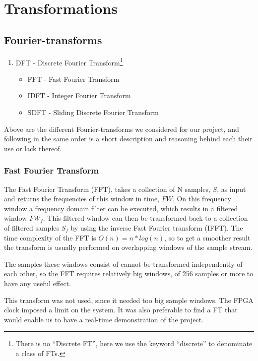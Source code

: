 \chapter{Transformations}
\section{Fourier-transforms}

\begin{enumerate}
\item DFT - Discrete Fourier Transform\footnote{There is no ``Discrete FT'',
here we use the keyword ``discrete'' to denominate a class of FTs.}
	\begin{itemize}
		\item FFT - Fast Fourier Transform
		\item IDFT - Integer Fourier Transform
		\item SDFT - Sliding Discrete Fourier Transform
	\end{itemize}
\end{enumerate}

Above are the different Fourier-transforms we considered for our project, and
following in the same order is a short description and reasoning behind  each
their use or lack thereof.

\subsection{Fast Fourier Transform}
The Fast Fourier Transform (FFT), takes a collection of N samples, $S$, as input
and returns the frequencies of this window in time, $FW$. On this frequency
window a frequency domain filter can be executed, which results in a filtered
window $FW_f$. This filtered window can then be transformed back to a collection
of filtered samples $S_f$ by using the inverse Fast Fourier transform (IFFT).
The time complexity of the FFT is $O(n) = n*log(n)$, so to get a smoother result
the transform is usually performed on overlapping windows of the sample stream.

The samples these windows consist of cannot be transformed independently of each
other, so the FFT requires relatively big windows, of 256 samples or more to
have any useful effect.


This transform was not used, since it needed too big sample windows. The FPGA
clock imposed a limit on the system. It was also preferable to find a FT that
would enable us to have a real-time demonstration of the project.

